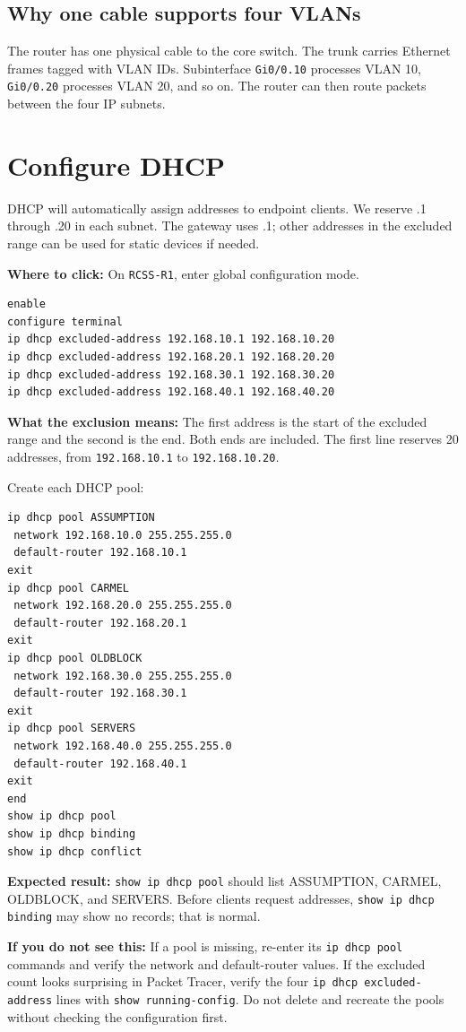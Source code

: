 \documentclass[11pt,a4paper]{article}
\newcommand{\clickpath}[1]{\noindent\colorbox{noteBG}{\parbox{0.96\linewidth}{\textbf{Where to click:} #1}}\par\vspace{5pt}}
\newcommand{\expected}[1]{\noindent\colorbox{noteBG}{\parbox{0.96\linewidth}{\textbf{Expected result:} #1}}\par\vspace{5pt}}
\newcommand{\ifnot}[1]{\noindent\colorbox{warnBG}{\parbox{0.96\linewidth}{\textbf{If you do not see this:} #1}}\par\vspace{5pt}}
\newcommand{\term}[2]{\noindent\textbf{#1:} #2\par\vspace{3pt}}
\begin{document}
\subsection*{Why one cable supports four VLANs}
The router has one physical cable to the core switch. The trunk carries Ethernet frames tagged with VLAN IDs. Subinterface \texttt{Gi0/0.10} processes VLAN 10, \texttt{Gi0/0.20} processes VLAN 20, and so on. The router can then route packets between the four IP subnets.

\section{Configure DHCP}\label{sec:dhcp}
DHCP will automatically assign addresses to endpoint clients. We reserve .1 through .20 in each subnet. The gateway uses .1; other addresses in the excluded range can be used for static devices if needed.

\clickpath{On \texttt{RCSS-R1}, enter global configuration mode.}
\begin{lstlisting}
enable
configure terminal
ip dhcp excluded-address 192.168.10.1 192.168.10.20
ip dhcp excluded-address 192.168.20.1 192.168.20.20
ip dhcp excluded-address 192.168.30.1 192.168.30.20
ip dhcp excluded-address 192.168.40.1 192.168.40.20
\end{lstlisting}
\term{What the exclusion means}{The first address is the start of the excluded range and the second is the end. Both ends are included. The first line reserves 20 addresses, from \texttt{192.168.10.1} to \texttt{192.168.10.20}.}

Create each DHCP pool:
\begin{lstlisting}
ip dhcp pool ASSUMPTION
 network 192.168.10.0 255.255.255.0
 default-router 192.168.10.1
exit
ip dhcp pool CARMEL
 network 192.168.20.0 255.255.255.0
 default-router 192.168.20.1
exit
ip dhcp pool OLDBLOCK
 network 192.168.30.0 255.255.255.0
 default-router 192.168.30.1
exit
ip dhcp pool SERVERS
 network 192.168.40.0 255.255.255.0
 default-router 192.168.40.1
exit
end
show ip dhcp pool
show ip dhcp binding
show ip dhcp conflict
\end{lstlisting}

\expected{\texttt{show ip dhcp pool} should list ASSUMPTION, CARMEL, OLDBLOCK, and SERVERS. Before clients request addresses, \texttt{show ip dhcp binding} may show no records; that is normal.}
\ifnot{If a pool is missing, re-enter its \texttt{ip dhcp pool} commands and verify the network and default-router values. If the excluded count looks surprising in Packet Tracer, verify the four \texttt{ip dhcp excluded-address} lines with \texttt{show running-config}. Do not delete and recreate the pools without checking the configuration first.}
\end{document}
